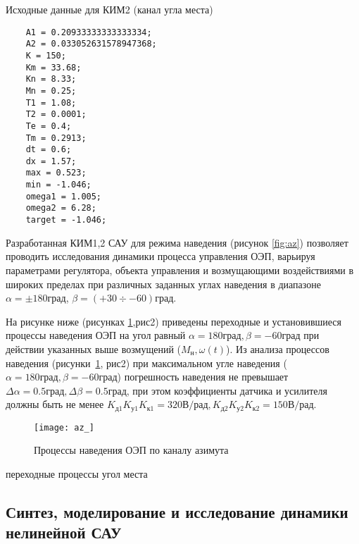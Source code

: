 \begin{ListingEnv}[!h]%
	\captiondelim{ } %
	\caption{Исходные данные для КИМ2 (канал угла места)}
	\label{lst:um}
	\begin{lstlisting}
	A1 = 0.20933333333333334;
	A2 = 0.033052631578947368;
	K = 150;
	Km = 33.68;
	Kn = 8.33;
	Mn = 0.25;
	T1 = 1.08;
	T2 = 0.0001;
	Te = 0.4;
	Tm = 0.2913;
	dt = 0.6;
	dx = 1.57;
	max = 0.523;
	min = -1.046;
	omega1 = 1.005;
	omega2 = 6.28;
	target = -1.046;
	\end{lstlisting}
\end{ListingEnv}%
Разработанная КИМ1,2 САУ для режима наведения (рисунок \ref{fig:az}) позволяет проводить исследования динамики процесса управления ОЭП, варьируя параметрами регулятора, объекта управления и возмущающими воздействиями в широких пределах при различных заданных углах наведения в диапазоне  \( \alpha = \pm 180 \textit{град}\), \( \beta = (+30 \div -60) \textit{град}\).

На рисунке ниже (рисунках \ref{fig:az_},рис2) приведены переходные и установившиеся процессы наведения ОЭП на угол равный \( \alpha = 180  \textit{град}, \beta = -60  \textit{град} \) при действии указанных выше возмущений ($M_{\textit{н}}, \omega(t)$). Из анализа процессов наведения (рисунки~\ref{fig:az_}, рис2) при максимальном угле наведения (\( \alpha = 180  \textit{град}, \beta = -60  \textit{град} \)) погрешность наведения не превышает $\Delta \alpha = 0.5 \textit{град}, \Delta \beta = 0.5 \textit{град}$, при этом коэффициенты датчика и усилителя должны быть не менее $K_{\textit{д1}} K_{\textit{у1}} K_{\textit{к1}} = 320 \textit{В/рад}, K_{\textit{д2}} K_{\textit{у2}} K_{\textit{к2}} = 150 \textit{В/рад}$.

\begin{figure}[ht]
	\centering
	\texttt{[image: az\_]} 
	\caption{Процессы наведения ОЭП по каналу азимута}
	\label{fig:az_}
\end{figure}

переходные процессы угол места

\subsection{Синтез, моделирование и исследование динамики нелинейной САУ} \label{subsec:ch4/sect4/sub2}


